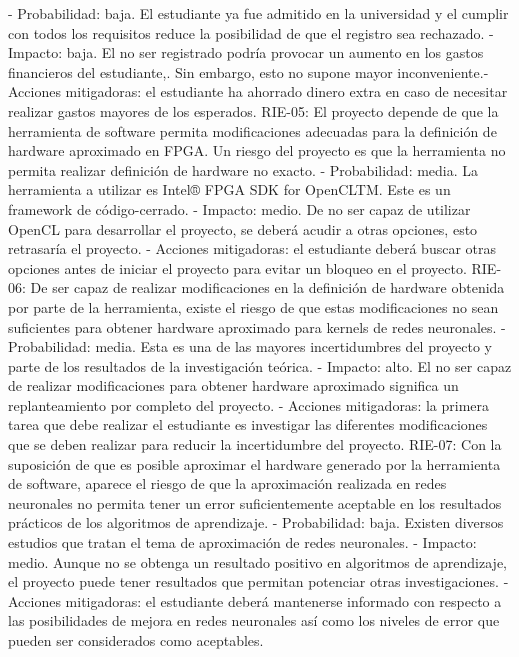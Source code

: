 - Probabilidad: baja. El estudiante ya fue admitido en la universidad y el cumplir con todos los
requisitos reduce la posibilidad de que el registro sea rechazado.
- Impacto: baja. El no ser registrado podría provocar un aumento en los gastos financieros del
estudiante,. Sin embargo, esto no supone mayor inconveniente.-
Acciones mitigadoras: el estudiante ha ahorrado dinero extra en caso de necesitar realizar
gastos mayores de los esperados.
RIE-05: El proyecto depende de que la herramienta de software permita modificaciones adecuadas para
la definición de hardware aproximado en FPGA. Un riesgo del proyecto es que la herramienta no
permita realizar definición de hardware no exacto.
- Probabilidad: media. La herramienta a utilizar es Intel® FPGA SDK for OpenCLTM. Este es un
framework de código-cerrado.
- Impacto: medio. De no ser capaz de utilizar OpenCL para desarrollar el proyecto, se deberá
acudir a otras opciones, esto retrasaría el proyecto.
- Acciones mitigadoras: el estudiante deberá buscar otras opciones antes de iniciar el proyecto
para evitar un bloqueo en el proyecto.
RIE-06: De ser capaz de realizar modificaciones en la definición de hardware obtenida por parte de la
herramienta, existe el riesgo de que estas modificaciones no sean suficientes para obtener hardware
aproximado para kernels de redes neuronales.
- Probabilidad: media. Esta es una de las mayores incertidumbres del proyecto y parte de los
resultados de la investigación teórica.
- Impacto: alto. El no ser capaz de realizar modificaciones para obtener hardware aproximado
significa un replanteamiento por completo del proyecto.
- Acciones mitigadoras: la primera tarea que debe realizar el estudiante es investigar las
diferentes modificaciones que se deben realizar para reducir la incertidumbre del proyecto.
RIE-07: Con la suposición de que es posible aproximar el hardware generado por la herramienta de
software, aparece el riesgo de que la aproximación realizada en redes neuronales no permita tener un
error suficientemente aceptable en los resultados prácticos de los algoritmos de aprendizaje.
- Probabilidad: baja. Existen diversos estudios que tratan el tema de aproximación de redes
neuronales.
- Impacto: medio. Aunque no se obtenga un resultado positivo en algoritmos de aprendizaje, el
proyecto puede tener resultados que permitan potenciar otras investigaciones.
- Acciones mitigadoras: el estudiante deberá mantenerse informado con respecto a las
posibilidades de mejora en redes neuronales así como los niveles de error que pueden ser
considerados como aceptables.

